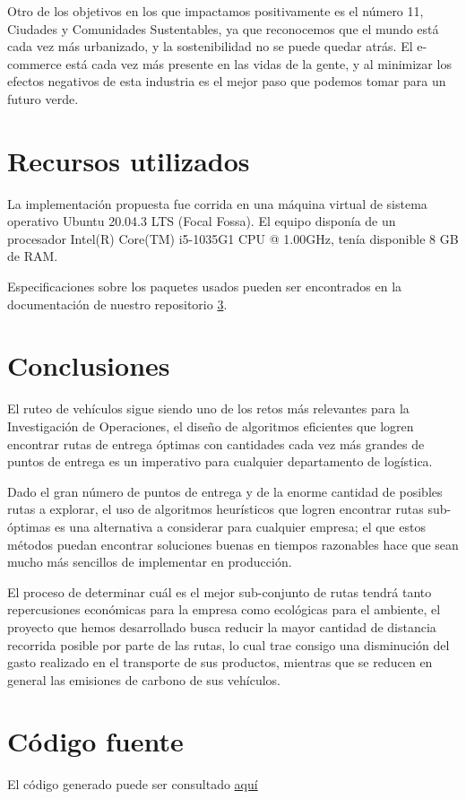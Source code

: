 \documentclass[journal]{IEEEtran}
\begin{document}
        Otro de los objetivos en los que impactamos positivamente es el número 11, Ciudades y Comunidades Sustentables, ya que reconocemos que el mundo está cada vez más urbanizado, y la sostenibilidad no se puede quedar atrás. El e-commerce está cada vez más presente en las vidas de la gente, y al minimizar los efectos negativos de esta industria es el mejor paso que podemos tomar para un futuro verde. 

    \section{Recursos utilizados} \label{sec:resources}
        
        La implementación propuesta fue corrida en una máquina virtual de sistema operativo Ubuntu 20.04.3 LTS (Focal Fossa). El equipo disponía de un procesador Intel(R) Core(TM) i5-1035G1 CPU @ 1.00GHz, tenía disponible 8 GB de RAM.

        Especificaciones sobre los paquetes usados pueden ser encontrados en la documentación de nuestro repositorio \ref{code:repo}.

    \section{Conclusiones} \label{sec:conclusions}
        
        El ruteo de vehículos sigue siendo uno de los retos más relevantes para la Investigación de Operaciones, el diseño de algoritmos eficientes que logren encontrar rutas de entrega óptimas con cantidades cada vez más grandes de puntos de entrega es un imperativo para cualquier departamento de logística.
        
        Dado el gran número de puntos de entrega y de la enorme cantidad de posibles rutas a explorar, el uso de algoritmos heurísticos que logren encontrar rutas sub-óptimas es una alternativa a considerar para cualquier empresa; el que estos métodos puedan encontrar soluciones buenas en tiempos razonables hace que sean mucho más sencillos de implementar en producción.
        
        El proceso de determinar cuál es el mejor sub-conjunto de rutas tendrá tanto repercusiones económicas para la empresa como ecológicas para el ambiente, el proyecto que hemos desarrollado busca reducir la mayor cantidad de distancia recorrida posible por parte de las rutas, lo cual trae consigo una disminución del gasto realizado en el transporte de sus productos, mientras que se reducen en general las emisiones de carbono de sus vehículos.
        
    \appendices
    
    \section{Código fuente}\label{code:repo}
    
        El código generado puede ser consultado \href{https://github.com/JuanEcheagaray75/capacitated-vrp}{aquí}
    
    
    
\end{document}
